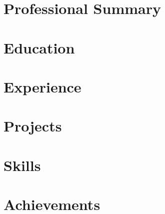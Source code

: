 \documentclass[a4paper]{article}
\begin{document}


\vspace{-2pt}
\section{Professional Summary}


\section{Education}
\resumeSubHeadingListStart

\resumeSubHeadingListEnd

\section{Experience}
\resumeSubHeadingListStart


\resumeSubHeadingListEnd

\section{Projects}
\projectSubheadingListStart






\projectSubheadingListEnd

\section{Skills}
\resumeSubHeadingListStart

\resumeSubHeadingListEnd

\section{Achievements}
\resumeSubHeadingListStart

\resumeSubHeadingListEnd
\end{document}
